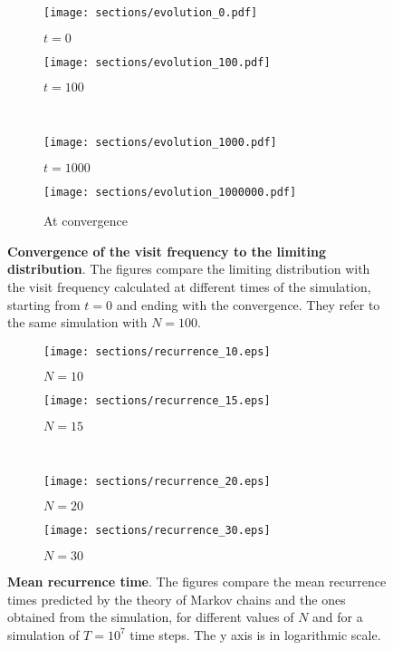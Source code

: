 \begin{figure}
  \begin{subfigure}{.5\textwidth}
      \centering
      \texttt{[image: sections/evolution\_0.pdf]}
      \caption{$t = 0$}
    \end{subfigure}
    \begin{subfigure}{.5\textwidth}
      \centering
      \texttt{[image: sections/evolution\_100.pdf]}
      \caption{$t = 100$}
    \end{subfigure}\\
    \begin{subfigure}{0.5\textwidth}
      \centering
      \texttt{[image: sections/evolution\_1000.pdf]}
      \caption{$t = 1000$}
    \end{subfigure}%
    \begin{subfigure}{0.5\textwidth}
      \centering
      \texttt{[image: sections/evolution\_1000000.pdf]}
      \caption{At convergence}
    \end{subfigure}

  \captionsetup{width=.9\linewidth}
  \caption{\textbf{Convergence of the visit frequency to the limiting distribution}. The figures compare the limiting distribution with the visit frequency calculated at different times of the simulation, starting from $t = 0$ and ending with the convergence. They refer to the same simulation with $N = 100$.}
  \label{fig:evolution}
\end{figure}


\begin{figure}
  \begin{subfigure}{.5\textwidth}
      \centering
      \texttt{[image: sections/recurrence\_10.eps]}
      \caption{$N = 10$}
    \end{subfigure}
    \begin{subfigure}{.5\textwidth}
      \centering
      \texttt{[image: sections/recurrence\_15.eps]}
      \caption{$N = 15$}
    \end{subfigure}\\
    \begin{subfigure}{0.5\textwidth}
      \centering
      \texttt{[image: sections/recurrence\_20.eps]}
      \caption{$N = 20$}
    \end{subfigure}%
    \begin{subfigure}{0.5\textwidth}
      \centering
      \texttt{[image: sections/recurrence\_30.eps]}
      \caption{$N = 30$}
    \end{subfigure}%

  \captionsetup{width=.9\linewidth}
  \caption{\textbf{Mean recurrence time}. The figures  compare the mean recurrence times predicted by the theory of Markov chains and the ones obtained from the simulation, for different values of $N$ and for a simulation of $T= 10^7$ time steps. The y axis is in logarithmic scale.}
  \label{fig:recurrence}
\end{figure}



